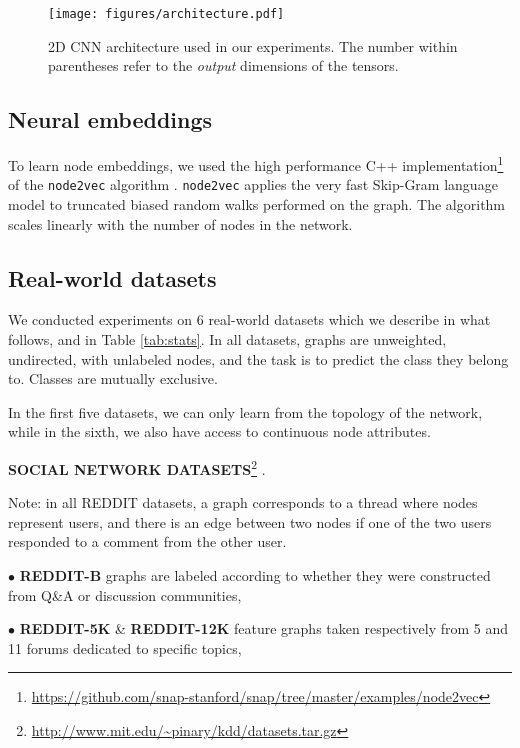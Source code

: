 \documentclass[sigconf]{acmart}
\begin{document}
\begin{figure}[h]
  \centering
    \texttt{[image: figures/architecture.pdf]}
\captionsetup{justification=justified,singlelinecheck=false, size=small}
    \caption{2D CNN architecture used in our experiments. The number within parentheses refer to the \textit{output} dimensions of the tensors. }
\label{fig:arch}
\end{figure}



\subsection{Neural embeddings}
To learn node embeddings, we used the high performance C++  implementation\footnote{\scriptsize{\url{https://github.com/snap-stanford/snap/tree/master/examples/node2vec}}} of the \texttt{node2vec} algorithm \citep{grover2016node2vec}. \texttt{node2vec} applies the very fast Skip-Gram language model \citep{mikolov2013efficient} to truncated biased random walks performed on the graph. The algorithm scales linearly with the number of nodes in the network.

\subsection{Real-world datasets}
We conducted experiments on 6 real-world datasets which we describe in what follows, and in Table \ref{tab:stats}. In all datasets, graphs are unweighted, undirected, with unlabeled nodes, and the task is to predict the class they belong to. Classes are mutually exclusive. 

In the first five datasets, we can only learn from the topology of the network, while in the sixth, we also have access to continuous node attributes.

\textbf{SOCIAL NETWORK DATASETS}\footnote{\scriptsize{\url{http://www.mit.edu/~pinary/kdd/datasets.tar.gz}}} \citep{yanardag2015deep}.

\noindent Note: in all REDDIT datasets, a graph corresponds to a thread where nodes represent users, and there is an edge between two nodes if one of the two users responded to a comment from the other user.

\noindent$\bullet$ \textbf{REDDIT-B} graphs are labeled according to whether they were constructed from Q\&A or discussion communities,

\noindent$\bullet$ \textbf{REDDIT-5K} \& \textbf{REDDIT-12K} feature graphs taken respectively from 5 and 11 forums dedicated to specific topics,
\end{document}
